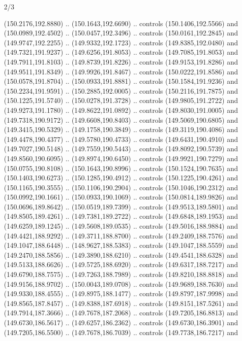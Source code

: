 \begin{flagdescription}{2/3}
\begin{scope}[shift={(0.5\flaglength,0.5)},scale=\flagwidth/320]
\begin{scope}[y=0.8pt, x=0.8pt, yscale=-1,shift={(-118.3,-146)}]
  (150.2176,192.8880) .. (150.1643,192.6690) .. controls (150.1406,192.5566) and
  (150.0989,192.4502) .. (150.0457,192.3496) .. controls (150.0161,192.2845) and
  (149.9747,192.2255) .. (149.9332,192.1723) .. controls (149.8385,192.0480) and
  (149.7321,191.9237) .. (149.6256,191.8053) .. controls (149.7085,191.8053) and
  (149.7911,191.8103) .. (149.8739,191.8226) .. controls (149.9153,191.8286) and
  (149.9511,191.8349) .. (149.9926,191.8467) .. controls (150.0222,191.8586) and
  (150.0578,191.8704) .. (150.0933,191.8881) .. controls (150.1584,191.9236) and
  (150.2234,191.9591) .. (150.2885,192.0005) .. controls (150.2116,191.7875) and
  (150.1225,191.5740) .. (150.0278,191.3728) .. controls (149.9805,191.2722) and
  (149.9273,191.1780) .. (149.8622,191.0892) .. controls (149.8030,191.0005) and
  (149.7318,190.9172) .. (149.6608,190.8403) .. controls (149.5069,190.6805) and
  (149.3415,190.5329) .. (149.1758,190.3849) .. controls (149.3119,190.4086) and
  (149.4478,190.4377) .. (149.5780,190.4733) .. controls (149.6431,190.4910) and
  (149.7027,190.5148) .. (149.7559,190.5443) .. controls (149.8092,190.5739) and
  (149.8560,190.6095) .. (149.8974,190.6450) .. controls (149.9921,190.7279) and
  (150.0755,190.8108) .. (150.1643,190.8996) .. controls (150.1524,190.7635) and
  (150.1403,190.6273) .. (150.1285,190.4912) .. controls (150.1225,190.4261) and
  (150.1165,190.3555) .. (150.1106,190.2904) .. controls (150.1046,190.2312) and
  (150.0992,190.1661) .. (150.0933,190.1069) .. controls (150.0814,189.9826) and
  (150.0696,189.8642) .. (150.0519,189.7399) .. controls (149.9513,189.5801) and
  (149.8505,189.4261) .. (149.7381,189.2722) .. controls (149.6848,189.1953) and
  (149.6259,189.1245) .. (149.5608,189.0535) .. controls (149.5016,188.9884) and
  (149.4421,188.9292) .. (149.3711,188.8700) .. controls (149.2409,188.7576) and
  (149.1047,188.6448) .. (148.9627,188.5383) .. controls (149.1047,188.5559) and
  (149.2470,188.5856) .. (149.3890,188.6210) .. controls (149.4541,188.6328) and
  (149.5133,188.6626) .. (149.5725,188.6920) .. controls (149.6317,188.7217) and
  (149.6790,188.7575) .. (149.7263,188.7989) .. controls (149.8210,188.8818) and
  (149.9156,188.9702) .. (150.0043,189.0708) .. controls (149.9689,188.7630) and
  (149.9330,188.4555) .. (149.8975,188.1477) .. controls (149.8797,187.9998) and
  (149.8565,187.8457) .. (149.8388,187.6918) .. controls (149.8151,187.5261) and
  (149.7914,187.3666) .. (149.7678,187.2068) .. controls (149.7205,186.8813) and
  (149.6730,186.5617) .. (149.6257,186.2362) .. controls (149.6730,186.3901) and
  (149.7205,186.5500) .. (149.7678,186.7039) .. controls (149.7738,186.7217) and

\end{scope}
\end{scope}
\end{flagdescription}
